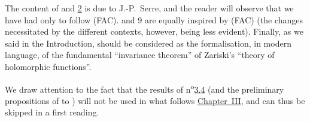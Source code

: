 The content of \textsection\hyperref[section:III.1]{} and \hyperref[section:III.2]{2} is due to J.-P.~Serre, and the reader will observe that we have had only to follow (FAC).
 and 9 are equally inspired by (FAC) (the changes necessitated by the different contexts, however, being less evident).
Finally, as we said in the Introduction, \hyperref[section:III.4]{} should be considered as the formalisation, in modern language, of the fundamental ``invariance theorem'' of Zariski's ``theory of holomorphic functions''.

We draw attention to the fact that the results of n\textsuperscript{o}\hyperref[subsection:III.3.4]{3.4} (and the preliminary propositions of  to ) will not be used in what follows \hyperref[section:ega3]{Chapter~III}, and can thus be skipped in a first reading.
\bigskip









